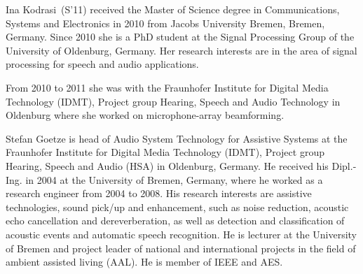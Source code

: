 \documentclass[10pt]{IEEEtran}
\begin{document}





\begin{IEEEbiography}
{Ina Kodrasi}~(S'11) received the Master of Science degree in Communications, Systems and Electronics in 2010 from Jacobs University Bremen, Bremen, Germany.
Since 2010 she is a PhD student at the Signal Processing Group of the University of Oldenburg, Germany.
Her research interests are in the area of signal processing for speech and audio applications.

From 2010 to 2011 she was with the Fraunhofer Institute for Digital Media Technology (IDMT), Project group
Hearing, Speech and Audio Technology in Oldenburg where she worked on microphone-array beamforming.
\end{IEEEbiography}

\begin{IEEEbiography}
{Stefan Goetze} is head of Audio System Technology for Assistive Systems at the Fraunhofer Institute for Digital Media Technology (IDMT), Project group Hearing, Speech and Audio (HSA) in Oldenburg, Germany.
He received his Dipl.-Ing. in 2004 at the University of Bremen, Germany, where he worked as a research engineer from 2004 to 2008.
His research interests are assistive technologies, sound pick/up and enhancement, such as noise reduction, acoustic echo cancellation and dereverberation, as well as detection and classification of acoustic events and automatic speech recognition.
He is lecturer at the University of Bremen and project leader of national and international projects in the field of ambient assisted living (AAL).
He is member of IEEE and AES.
\end{IEEEbiography}
\end{document}
